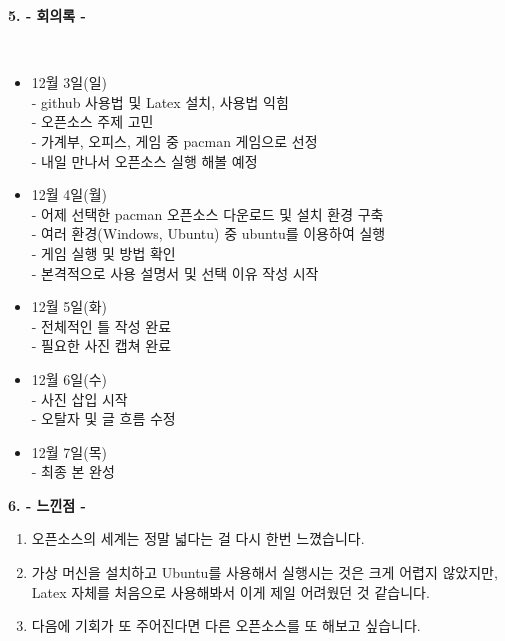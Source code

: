 \documentclass{article}
\begin{document}
\newpage
\begin{large}\textbf{5. - 회의록 -}\end{large}\\
\begin{itemize}
\item 12월 3일(일)\\
 
- github 사용법 및 Latex 설치, 사용법 익힘\\
 
- 오픈소스 주제 고민\\
 
- 가계부, 오피스, 게임 중 pacman 게임으로 선정\\
 
- 내일 만나서 오픈소스 실행 해볼 예정\\
 
\item 12월 4일(월)\\
 
- 어제 선택한 pacman 오픈소스 다운로드 및 설치 환경 구축\\
 
- 여러 환경(Windows, Ubuntu) 중 ubuntu를 이용하여 실행\\
 
- 게임 실행 및 방법 확인\\
 
- 본격적으로 사용 설명서 및 선택 이유 작성 시작\\
 
\item 12월 5일(화)\\
 
 - 전체적인 틀 작성 완료\\
 
 - 필요한 사진 캡쳐 완료\\
 
\item 12월 6일(수)\\
 
 - 사진 삽입 시작\\
 
 - 오탈자 및 글 흐름 수정\\
 
\item 12월 7일(목)\\

 - 최종 본 완성\\
\end{itemize}

\begin{large}\textbf{6. - 느낀점 -}\end{large}
\begin{enumerate}
\item 오픈소스의 세계는 정말 넓다는 걸 다시 한번 느꼈습니다.
\item 가상 머신을 설치하고 Ubuntu를 사용해서 실행시는 것은 크게 어렵지 않았지만, Latex 자체를 처음으로 사용해봐서
이게 제일 어려웠던 것 같습니다.
\item 다음에 기회가 또 주어진다면 다른 오픈소스를 또 해보고 싶습니다.
\end{enumerate}
\end{document}
